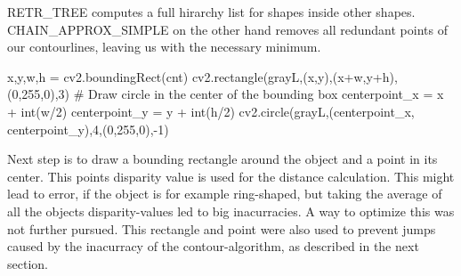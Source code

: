\documentclass[journal,onecolumn]{IEEEtran}
\begin{document}
RETR\_TREE computes a full hirarchy list for shapes inside other shapes. CHAIN\_APPROX\_SIMPLE on the other hand removes all redundant points of our contourlines, leaving us with the necessary minimum.
\begin{python}
x,y,w,h = cv2.boundingRect(cnt)
cv2.rectangle(grayL,(x,y),(x+w,y+h),(0,255,0),3)
# Draw circle in the center of the bounding box
centerpoint_x = x + int(w/2)
centerpoint_y = y + int(h/2)
cv2.circle(grayL,(centerpoint_x, centerpoint_y),4,(0,255,0),-1)
\end{python}
\noindent Next step is to draw a bounding rectangle around the object and a point in its center. This points disparity value is used for the distance calculation. This might lead to error, if the object is for example ring-shaped, but taking the average of all the objects disparity-values led to big inacurracies. A way to optimize this was not further pursued. \newline
This rectangle and point were also used to prevent jumps caused by the inacurracy of the contour-algorithm, as described in the next section. 
\end{document}
